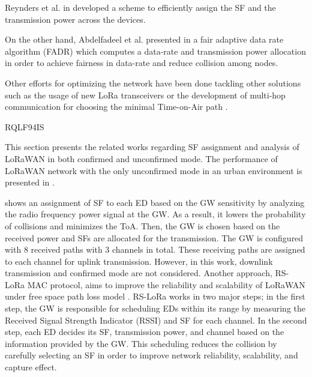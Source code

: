 Reynders et al.
in \cite{reynders_power_2017} developed a scheme to efficiently assign the SF and the transmission power across the devices.

On the other hand,
	Abdelfadeel et al.
presented in \cite{abdelfadeel_fair_2018} a fair adaptive data rate algorithm (FADR) which computes a data-rate and transmission power allocation in order to achieve fairness in data-rate and reduce collision among nodes.

Other efforts for optimizing the network have been done tackling other solutions such as the usage of new LoRa transceivers \cite{bor_lora_nodate} or the development of multi-hop communication for choosing the minimal Time-on-Air path \cite{sartori_enabling_2017}.

\cite{farhad_scalability_2019} RQLF94IS

This section presents the related works regarding SF assignment and analysis of LoRaWAN in both confirmed and unconfirmed mode.
The performance of LoRaWAN network with the only unconfirmed mode in an urban environment is presented in \cite{magrin_performance_2017}.

\cite{magrin_performance_2017} shows an assignment of SF to each ED based on the GW sensitivity by analyzing the radio frequency power signal at the GW.
As a result,
	it lowers the probability of collisions and minimizes the ToA.
Then,
	the GW is chosen based on the received power and SFs are allocated for the transmission.
The GW is configured with 8 received paths with 3 channels in total.
These receiving paths are assigned to each channel for uplink transmission.
However,
	in this work,
	downlink transmission and confirmed mode are not considered.
Another approach,
	RS-LoRa MAC protocol,
	aims to improve the reliability and scalability of LoRaWAN under free space path loss model \cite{reynders_improving_2018}.
RS-LoRa works in two major steps;
	in the first step,
	the GW is responsible for scheduling EDs within its range by measuring the Received Signal Strength Indicator (RSSI) and SF for each channel.
In the second step,
	each ED decides its SF,
	transmission power,
	and channel based on the information provided by the GW.
This scheduling reduces the collision by carefully selecting an SF in order to improve network reliability,
	scalability,
	and capture effect.

